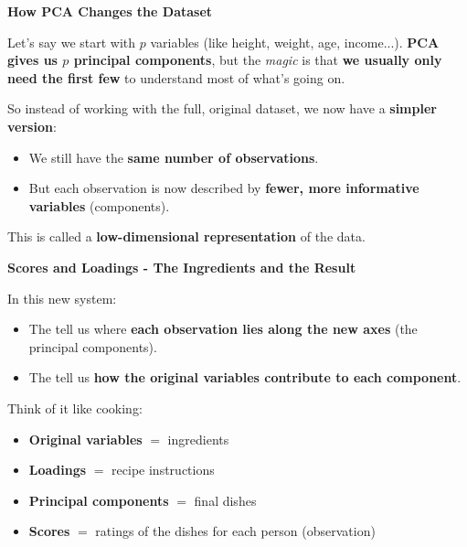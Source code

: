 \newpage

\begin{flushleft}
    \textcolor{Green3}{ \textbf{How PCA Changes the Dataset}}
\end{flushleft}
Let's say we start with $p$ variables (like height, weight, age, income...). \textbf{PCA gives us $p$ principal components}, but the \emph{magic} is that \textbf{we usually only need the first few} to understand most of what's going on.

\highspace
So instead of working with the full, original dataset, we now have a \textbf{simpler version}:
\begin{itemize}
	\item We still have the \textbf{same number of observations}.
	\item But each observation is now described by \textbf{fewer, more informative variables} (components).
\end{itemize}
This is called a \textbf{low-dimensional representation} of the data.

\highspace
\begin{flushleft}
	\textcolor{Green3}{ \textbf{Scores and Loadings - The Ingredients and the Result}}
\end{flushleft}
In this new system:
\begin{itemize}
    \item The  tell us where \textbf{each observation lies along the new axes} (the principal components).
    \item The  tell us \textbf{how the original variables contribute to each component}.
\end{itemize}
Think of it like cooking:
\begin{itemize}
    \item \textbf{Original variables} $=$ ingredients
    \item \textbf{Loadings} $=$ recipe instructions
    \item \textbf{Principal components} $=$ final dishes
    \item \textbf{Scores} $=$ ratings of the dishes for each person (observation)
\end{itemize}


